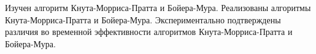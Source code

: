 \Conclusion %
Изучен алгоритм Кнута-Морриса-Пратта и  Бойера-Мура. Реализованы алгоритмы Кнута-Морриса-Пратта и  Бойера-Мура. Экспериментально подтверждены различия во временной эффективности алгоритмов Кнута-Морриса-Пратта и  Бойера-Мура.
